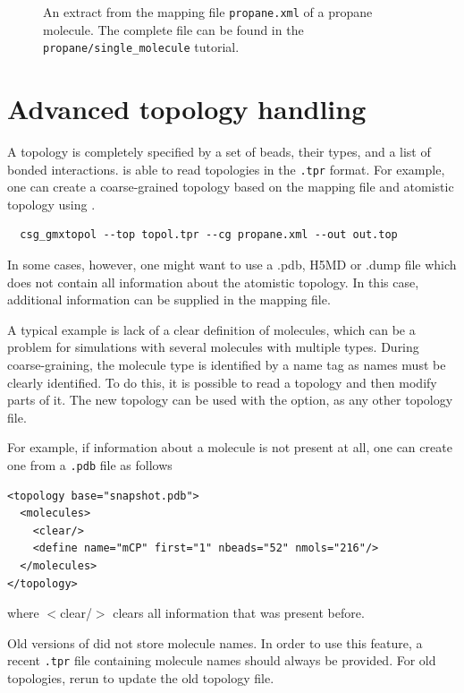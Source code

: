 \begin{figure}
\centering
\framebox{

}
\caption{An extract from the mapping file \texttt{propane.xml} of a propane molecule. The complete file can be found in the \texttt{propane/single\_molecule} tutorial.}
\end{figure}

\section{Advanced topology handling}
\label{sec:adv_topology}
A topology is completely specified by a set of beads, their types, and a list of bonded interactions. \votca is able to read topologies in the \gromacs \texttt{.tpr} format. For example, one can create a coarse-grained topology based on the mapping file and atomistic \gromacs topology using .
\begin{verbatim}
  csg_gmxtopol --top topol.tpr --cg propane.xml --out out.top
\end{verbatim}


In some cases, however, one might want to use a .pdb, H5MD or .dump file which does not contain all information about the atomistic topology. In this case, additional information can be supplied in the \xml mapping file.

A typical example is lack of a clear definition of molecules, which can be a problem for simulations with several molecules with multiple types. During coarse-graining, the molecule type is identified by a name tag as names must be clearly identified. To do this, it is possible to read a topology and then modify parts of it. The new \xml topology can be used with the  option, as any other topology file.

For example, if information about a molecule is not present at all, one can create one from a \texttt{.pdb} file as follows
\begin{lstlisting}
<topology base="snapshot.pdb">
  <molecules>
    <clear/>
    <define name="mCP" first="1" nbeads="52" nmols="216"/>
  </molecules>
</topology>
\end{lstlisting}
where $<$clear/$>$ clears all information that was present before.

Old versions of \gromacs did not store molecule names. In order to use this feature, a recent \texttt{.tpr} file containing molecule names should always be provided. For old topologies, rerun \gromacs {} to update the old topology file.

